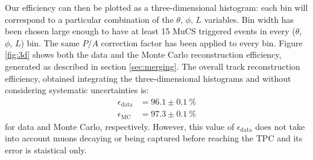 \documentclass[a4paper]{scrartcl}
\begin{document}
Our efficiency can then be plotted as a three-dimensional histogram: each bin will correspond to a particular combination of the $\theta$, $\phi$, $L$ variables. Bin width has been chosen large enough to have at least 15 MuCS triggered events in every ($\theta$, $\phi$, $L$) bin. The same $P/A$ correction factor has been applied to every bin. Figure \ref{fig:3d} shows both the data and the Monte Carlo reconstruction efficiency, generated as described in section \ref{sec:merging}. The overall track reconstruction efficiency, obtained integrating the three-dimensional histograms and without considering systematic uncertainties is:
\begin{align*}
\epsilon_{\mathrm{data}} &= 96.1 \pm 0.1~\%\\
\epsilon_{\mathrm{MC}} &= 97.3 \pm 0.1~\%
\end{align*} for data and Monte Carlo, respectively. However, this value of $\epsilon_{\mathrm{data}}$ does not take into account muons decaying or being captured before reaching the TPC and its error is staistical only.
\end{document}
